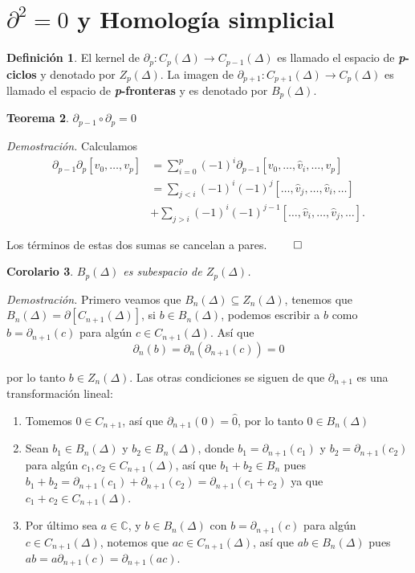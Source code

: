 \documentclass[12pt]{book}
\newtheorem{theorem}{Teorema}[section]
\newtheorem{corollary}[theorem]{Corolario}
\theoremstyle{definition}
\newtheorem{definition}[theorem]{Definición}
\newcounter{in}
\newcounter{ini}
\begin{document}
{\section{$\partial^{2}=0$ y Homología simplicial}

\begin{definition}
   El kernel de $\partial_{p}:C_{p}(\Delta)\rightarrow
   C_{p-1}(\Delta)$ es llamado el espacio de
   \textbf{\emph{p}-ciclos} y denotado por $Z_{p}(\Delta)$. La imagen
   de $\partial_{p+1}:C_{p+1}(\Delta)\rightarrow C_{p}(\Delta)$ es
   llamado el espacio de \textbf{\emph{p}-fronteras} y es denotado por $B_{p}(\Delta)$.
\end{definition}

\begin{theorem}
    $\partial_{p-1}\circ\partial_{p}=0$
\end{theorem}

\textit{Demostración.} Calculamos 
\begin{align*}
  \partial_{p-1}\partial_{p}[v_{0},\ldots,v_{p}]&=\sum_{i=0}^{p}(-1)^{i}\partial_{p-1}[v_{0},\ldots,\widehat
  v_{i},\ldots,v_{p}]\\
  &=\sum_{j<i}(-1)^{i}(-1)^{j}[\ldots,\widehat v_{j},\ldots,\widehat v_{i},\ldots]\\
  &+\sum_{j>i}(-1)^{i}(-1)^{j-1}[\ldots,\widehat v_{i},\ldots,\widehat v_{j},\ldots].
\end{align*}

Los términos de estas dos sumas se cancelan a pares. $\qed$

\begin{corollary}
  $B_{p}(\Delta)$ es subespacio de $Z_{p}(\Delta)$.
\end{corollary}

\textit{Demostración.} Primero veamos que $B_{n}(\Delta)\subseteq Z_{n}(\Delta)$, tenemos que
$B_{n}(\Delta)=\partial[C_{n+1}(\Delta)]$, si $b\in B_{n}(\Delta)$,
podemos escribir a $b$ como $b=\partial_{n+1}(c)$ para algún $c\in
C_{n+1}(\Delta)$. Así que
$$\partial_{n}(b)=\partial_{n}(\partial_{n+1}(c))=0$$

por lo tanto $b\in Z_{n}(\Delta)$.
Las otras condiciones se siguen de que $\partial_{n+1}$ es una
transformación lineal:

\begin{enumerate}
  \item Tomemos $0\in C_{n+1}$, así que $\partial_{n+1}(0)=\widehat 0$,
    por lo tanto $\widehat 0\in B_{n}(\Delta)$
  \item Sean $b_{1}\in B_{n}(\Delta)$ y $b_{2}\in B_{n}(\Delta)$,
    donde $b_{1}=\partial_{n+1}(c_{1})$ y $b_{2}=\partial_{n+1}(c_{2})$ para
    algún $c_{1},c_{2}\in C_{n+1}(\Delta)$, así que $b_{1}+b_{2}\in B_{n}$
    pues $b_{1}+b_{2}=\partial_{n+1}(c_{1})+\partial_{n+1}(c_{2})=\partial_{n+1}(c_{1}+c_{2})$
    ya que $c_{1}+c_{2}\in C_{n+1}(\Delta)$.
  \item Por último sea $a\in \mathbb{C}$, y $b\in B_{n}(\Delta)$ con
    $b=\partial_{n+1}(c)$ para algún $c\in C_{n+1}(\Delta)$, notemos
    que $ac\in C_{n+1}(\Delta)$, así que $ab\in B_{n}(\Delta)$ pues $ab=a\partial_{n+1}(c)=\partial_{n+1}(ac)$.
\end{enumerate}
 
}
\end{document}
